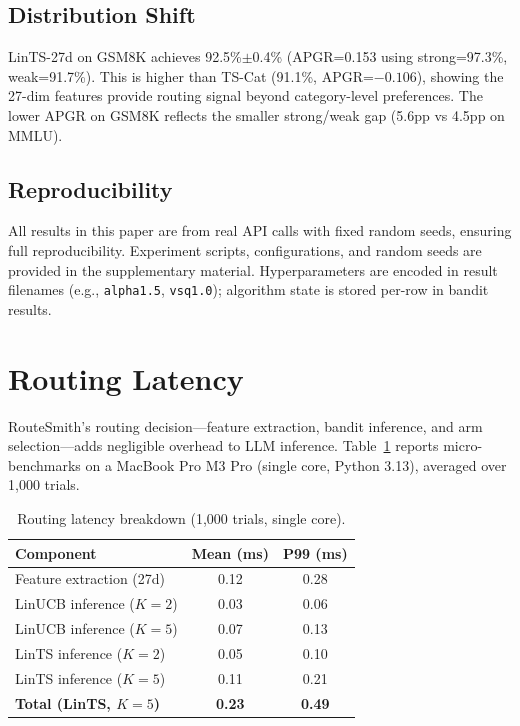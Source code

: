 \documentclass[11pt]{article}
\begin{document}
\subsection{Distribution Shift}

LinTS-27d on GSM8K achieves 92.5\%$\pm$0.4\% (APGR=0.153 using strong=97.3\%, weak=91.7\%). This is higher than TS-Cat (91.1\%, APGR=$-0.106$), showing the 27-dim features provide routing signal beyond category-level preferences. The lower APGR on GSM8K reflects the smaller strong/weak gap (5.6pp vs 4.5pp on MMLU).

\subsection{Reproducibility}

All results in this paper are from real API calls with fixed random seeds, ensuring full reproducibility. Experiment scripts, configurations, and random seeds are provided in the supplementary material. Hyperparameters are encoded in result filenames (e.g., \texttt{alpha1.5}, \texttt{vsq1.0}); algorithm state is stored per-row in bandit results.

\section{Routing Latency}

RouteSmith's routing decision---feature extraction, bandit inference, and arm selection---adds negligible overhead to LLM inference. Table~\ref{tab:latency} reports micro-benchmarks on a MacBook Pro M3 Pro (single core, Python 3.13), averaged over 1,000 trials.

\begin{table}[h]
\centering
\caption{Routing latency breakdown (1,000 trials, single core).}
\label{tab:latency}
\begin{tabular}{@{}lcc@{}}
\toprule
\textbf{Component} & \textbf{Mean (ms)} & \textbf{P99 (ms)} \\
\midrule
Feature extraction (27d)     & 0.12 & 0.28 \\
LinUCB inference ($K{=}2$)  & 0.03 & 0.06 \\
LinUCB inference ($K{=}5$)  & 0.07 & 0.13 \\
LinTS inference ($K{=}2$)   & 0.05 & 0.10 \\
LinTS inference ($K{=}5$)   & 0.11 & 0.21 \\
\midrule
\textbf{Total (LinTS, $K{=}5$)} & \textbf{0.23} & \textbf{0.49} \\
\bottomrule
\end{tabular}
\end{table}
\end{document}
